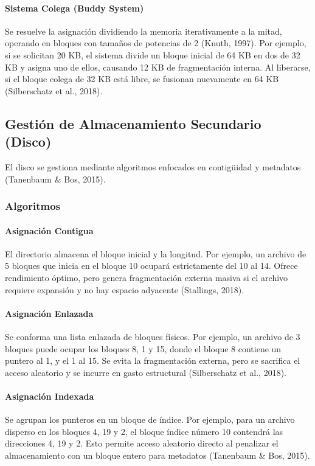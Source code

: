 \documentclass[12pt,a4paper]{article}
\begin{document}
\paragraph{Sistema Colega (Buddy System)}
Se resuelve la asignación dividiendo la memoria iterativamente a la mitad, operando en bloques con tamaños de potencias de 2 (Knuth, 1997). Por ejemplo, si se solicitan 20 KB, el sistema divide un bloque inicial de 64 KB en dos de 32 KB y asigna uno de ellos, causando 12 KB de fragmentación interna. Al liberarse, si el bloque colega de 32 KB está libre, se fusionan nuevamente en 64 KB (Silberschatz et al., 2018).

\subsection{Gestión de Almacenamiento Secundario (Disco)}
El disco se gestiona mediante algoritmos enfocados en contigüidad y metadatos (Tanenbaum \& Bos, 2015).

\subsubsection{Algoritmos}

\paragraph{Asignación Contigua}
El directorio almacena el bloque inicial y la longitud. Por ejemplo, un archivo de 5 bloques que inicia en el bloque 10 ocupará estrictamente del 10 al 14. Ofrece rendimiento óptimo, pero genera fragmentación externa masiva si el archivo requiere expansión y no hay espacio adyacente (Stallings, 2018).

\paragraph{Asignación Enlazada}
Se conforma una lista enlazada de bloques físicos. Por ejemplo, un archivo de 3 bloques puede ocupar los bloques 8, 1 y 15, donde el bloque 8 contiene un puntero al 1, y el 1 al 15. Se evita la fragmentación externa, pero se sacrifica el acceso aleatorio y se incurre en gasto estructural (Silberschatz et al., 2018).

\paragraph{Asignación Indexada}
Se agrupan los punteros en un bloque de índice. Por ejemplo, para un archivo disperso en los bloques 4, 19 y 2, el bloque índice número 10 contendrá las direcciones 4, 19 y 2. Esto permite acceso aleatorio directo al penalizar el almacenamiento con un bloque entero para metadatos (Tanenbaum \& Bos, 2015).
\end{document}
